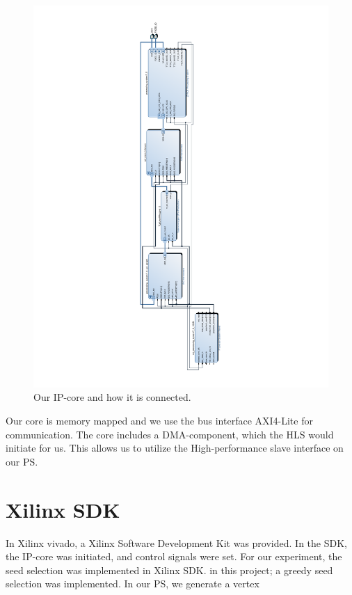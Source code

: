 \begin{figure}[!ht]
\includegraphics[scale=0.7]{Figures/design_1}
\caption{Our IP-core and how it is connected.}
\label{fig:vivadoImple}
\end{figure}

Our core is memory mapped and we use the bus interface AXI4-Lite for communication. The core includes a DMA-component, which the HLS would initiate for us. This allows us to utilize the High-performance slave interface on our PS.


\section{Xilinx SDK}
In Xilinx vivado, a Xilinx Software Development Kit was provided. In the SDK, the IP-core was initiated, and control signals were set. For our experiment, the seed selection was implemented in Xilinx SDK. in this project; a greedy seed selection was implemented. In our PS, we generate a vertex 



